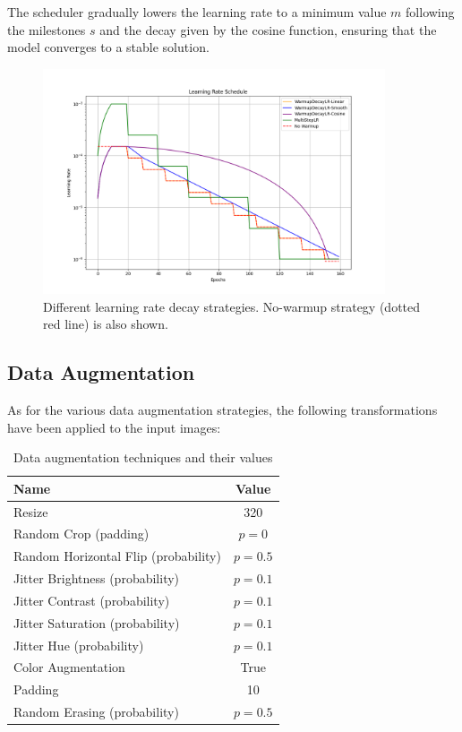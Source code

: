 The scheduler gradually lowers the learning rate to a minimum value $m$ following the milestones $s$ and the decay given by  the cosine function, ensuring that the model converges to a stable solution.

\begin{figure}[H]
    \centering
    \includegraphics[width=0.90\textwidth]{Images/Schedulers.png}
    \caption[Learning Rate Schedulers]{Different learning rate decay strategies. No-warmup strategy (dotted red line) is also shown.}
    \label{fig:Schedulers}
\end{figure}

\subsection{Data Augmentation}
As for the various data augmentation strategies, the following transformations have been applied to the input images:
\begin{table}[h!]
    \centering
    \begin{tabular}{|l|c|}
        \hline
        \textbf{Name} & \textbf{Value} \\ \hline
        Resize & 320 \\ \hline
        Random Crop (padding) & $p = 0$ \\ \hline
        Random Horizontal Flip (probability) & $p = 0.5$ \\ \hline
        Jitter Brightness (probability) & $p = 0.1$ \\ \hline
        Jitter Contrast (probability) & $p = 0.1$ \\ \hline
        Jitter Saturation (probability) & $p = 0.1$ \\ \hline
        Jitter Hue (probability) & $p = 0.1$ \\ \hline
        Color Augmentation & True \\ \hline
        Padding & 10 \\ \hline
        Random Erasing (probability) & $p = 0.5$ \\ \hline
    \end{tabular}
    \caption{Data augmentation techniques and their values}
    \label{tab:augmentation}
\end{table}

